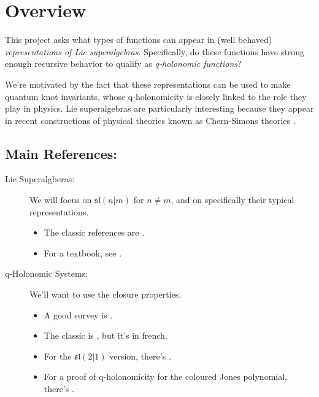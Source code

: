 \documentclass[a4paper]{article}
\begin{document}
\vspace{1cm}

\section*{Overview}
This project asks what types of functions can appear in (well behaved) \emph{representations of Lie superalgebras}.
Specifically, do these functions have strong enough recursive behavior to qualify as \emph{q-holonomic functions}?

We're motivated by the fact that these representations can be used to make quantum knot invariants, whose q-holonomicity is closely linked to the role they play in physics.
Lie superalgebras are particularly interesting because they appear in recent constructions of physical theories known as Chern-Simons theories \cite{Mikhaylov_Witten_2015}.

\subsection*{Main References:}

\begin{description}
  \item[Lie Superalgberas:] We will focus on $\mathfrak{sl}(n|m)$ for $n \neq m$, and on specifically their typical representations.
    \begin{itemize}
      \item The classic references are \cite{Kac1977,Kac_1978}.
      \item For a textbook, see \cite{Musson_2012}.
    \end{itemize}

  \item[q-Holonomic Systems:]
  We'll want to use the closure properties.
    \begin{itemize}
     \item A good survey is \cite{Garoufalidis_Le_2016}.
     \item The classic is \cite{Sabbah_1993}, but it's in french. 
     \item For the $\mathfrak{sl}(2|1)$ version, there's \cite{Brown_Geer_2024}.
     \item For a proof of q-holonomicity for the coloured Jones polynomial, there's \cite{Garoufalidis_Le_2005}.
  \end{itemize}
\end{description}
\end{document}
